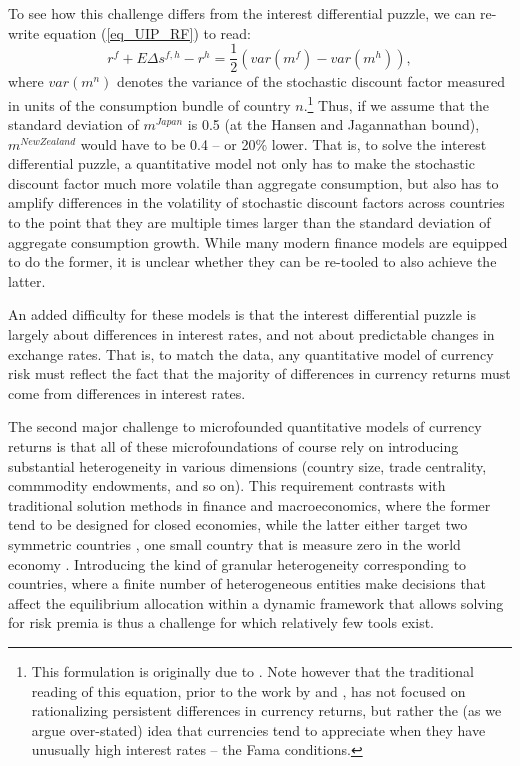 \documentclass{ar-1col}
\begin{document}
To see how this challenge differs from the interest differential puzzle, we can re-write equation (\ref{eq_UIP_RF}) to read: 
\begin{equation}
  r^{f} + E \Delta  s^{f,h} - r^{h} 
  =\frac{1}{2}\left(var(m^f)-var(m^h)\right),
\end{equation} 
where $var(m^n)$ denotes the variance of the stochastic discount factor measured in units of the consumption bundle of country $n$.\footnote{This formulation is originally due to \cite{Backusetal2001}. Note however that the traditional reading of this equation, prior to the work by \cite{LustigRoussanovVerdelhan2011} and \cite{HassanMano2019}, has not focused on rationalizing persistent differences in currency returns, but rather the (as we argue over-stated) idea that currencies tend to appreciate when they have unusually high interest rates -- the Fama conditions.} Thus, if we assume that the standard deviation of $m^{Japan}$ is 0.5 (at the Hansen and Jagannathan bound), $m^{New Zealand}$ would have to be 0.4 -- or 20\% lower. That is, to solve the interest differential puzzle, a quantitative model not only has to make the stochastic discount factor much more volatile than aggregate consumption, but also has to amplify differences in the volatility of stochastic discount factors across countries to the point that they are multiple times larger than the standard deviation of aggregate consumption growth. While many modern finance models are equipped to do the former, it is unclear whether they can be re-tooled to also achieve the latter. 

An added difficulty for these models is that the interest differential puzzle is largely about differences in interest rates, and not about predictable changes in exchange rates. That is, to match the data, any quantitative model of currency risk must reflect the fact that the majority of differences in currency returns must come from differences in interest rates. 

The second major challenge to microfounded quantitative models of currency returns is that all of these microfoundations of course rely on introducing substantial heterogeneity in various dimensions (country size, trade centrality, commmodity endowments, and so on). This requirement contrasts with traditional solution methods in finance and macroeconomics, where the former tend to be designed for closed economies, while the latter either target two symmetric countries \citep{Backusetal1992}, one small country that is measure zero in the world economy \citep{Mendoza}. Introducing the kind of granular heterogeneity corresponding to countries, where a finite number of heterogeneous entities make decisions that affect the equilibrium allocation within a dynamic framework that allows solving for risk premia is thus a challenge for which relatively few tools exist. 
\end{document}
